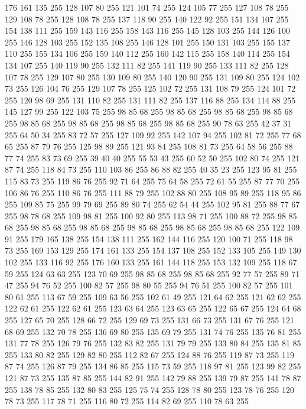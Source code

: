 176 161 135 255 128 107 80 255 121 101 74 255 124 105 77 255 127 108 78 255 129 108 78 255 128 108 78 255 137 118 90 255 140 122 92 255 151 134 107 255 154 138 111 255 159 143 116 255 158 143 116 255 145 128 103 255 144 126 100 255 146 128 103 255 152 135 108 255 146 128 101 255 150 131 103 255 155 137 110 255 155 134 106 255 159 140 112 255 160 142 115 255 158 140 114 255 154 134 107 255 140 119 90 255 132 111 82 255 141 119 90 255 133 111 82 255 128 107 78 255 129 107 80 255 130 109 80 255 140 120 90 255 131 109 80 255 124 102 73 255 126 104 76 255 129 107 78 255 125 102 72 255 131 108 79 255 124 101 72 255 120 98 69 255 131 110 82 255 131 111 82 255 137 116 88 255 134 114 88 255 145 127 99 255 122 103 75 255 98 85 68 255 98 85 68 255 98 85 68 255 98 85 68 255 98 85 68 255 98 85 68 255 98 85 68 255 98 85 68 255 90 78 63 255 42 37 31 255 64 50 34 255 83 72 57 255 127 109 92 255 142 107 94 255 102 81 72 255 77 68 65 255 87 79 76 255
125 98 89 255 121 93 84 255 108 81 73 255 64 58 56 255 88 77 74 255 83 73 69 255 39 40 40 255 55 53 43 255 60 52 50 255 102 80 74 255 121 87 74 255 118 84 73 255 110 103 86 255 86 88 82 255 40 35 23 255 123 95 81 255 115 83 73 255 119 86 76 255 92 71 64 255 75 64 58 255 72 61 55 255 87 77 70 255 106 86 76 255 110 86 76 255 111 88 79 255 102 88 80 255 108 95 89 255 118 95 86 255 109 85 75 255 99 79 69 255 89 80 74 255 62 54 44 255 102 95 81 255 88 77 67 255 98 78 68 255 109 98 81 255 100 92 80 255 113 98 71 255 100 88 72 255 98 85 68 255 98 85 68 255 98 85 68 255 98 85 68 255 98 85 68 255 98 85 68 255 122 109 91 255 179 165 138 255 154 138 111 255 162 144 116 255 120 100 71 255 118 98 73 255 169 153 129 255 174 161 133 255 154 137 108 255 152 133 105 255 149 130 102 255 133 116 92 255 176 160 133 255 161 144 118 255 153 132 109 255 118 67 59 255 124 63 63 255 123 70 69 255 98 85 68 255
98 85 68 255 92 77 57 255 89 71 47 255 94 76 52 255 100 82 57 255 98 80 55 255 94 76 51 255 100 82 57 255 101 80 61 255 113 67 59 255 109 63 56 255 102 61 49 255 121 64 62 255 121 62 62 255 122 62 61 255 122 62 61 255 123 63 64 255 123 63 65 255 122 65 67 255 124 64 68 255 127 65 70 255 128 66 72 255 129 69 73 255 131 66 73 255 131 67 76 255 121 68 69 255 132 70 78 255 136 69 80 255 135 69 79 255 131 74 76 255 135 76 81 255 131 77 78 255 126 79 76 255 132 83 82 255 131 79 79 255 133 80 84 255 135 81 85 255 133 80 82 255 129 82 80 255 112 82 67 255 124 88 76 255 119 87 73 255 119 87 74 255 126 87 79 255 134 86 85 255 115 73 59 255 118 97 81 255 123 99 82 255 121 87 73 255 135 87 85 255 144 82 91 255 142 79 88 255 139 79 87 255 141 78 87 255 138 78 85 255 132 80 83 255 125 75 74 255 128 78 80 255 123 78 76 255 120 78 73 255 117 78 71 255 116 80 72 255 114 82 69 255 110 78 63 255
